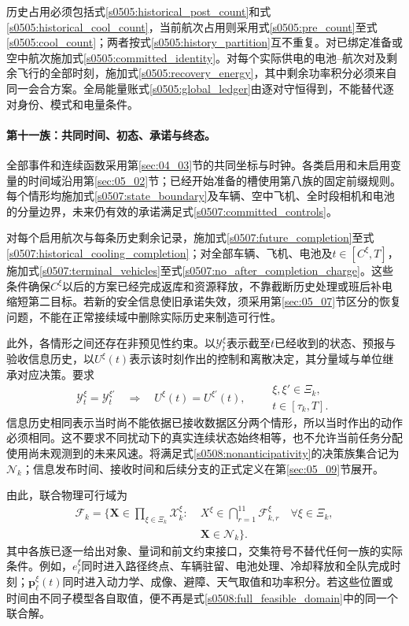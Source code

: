 历史占用必须包括式\eqref{s0505:historical_post_count}和式\eqref{s0505:historical_cool_count}，当前航次占用则采用式\eqref{s0505:pre_count}至式\eqref{s0505:cool_count}；两者按式\eqref{s0505:history_partition}互不重复。对已绑定准备或空中航次施加式\eqref{s0505:committed_identity}。对每个实际供电的电池--航次对及剩余飞行的全部时刻，施加式\eqref{s0505:recovery_energy}，其中剩余功率积分必须来自同一会合方案。全局能量账式\eqref{s0505:global_ledger}由逐对守恒得到，不能替代逐对身份、模式和电量条件。

\paragraph{第十一族：共同时间、初态、承诺与终态。}
全部事件和连续函数采用第\ref{sec:04_03}节的共同坐标与时钟。各类启用和未启用变量的时间域沿用第\ref{sec:05_02}节；已经开始准备的槽使用第八族的固定前缀规则。每个情形均施加式\eqref{s0507:state_boundary}及车辆、空中飞机、全时段相机和电池的分量边界，未来仍有效的承诺满足式\eqref{s0507:committed_controls}。

对每个启用航次与每条历史剩余记录，施加式\eqref{s0507:future_completion}至式\eqref{s0507:historical_cooling_completion}；对全部车辆、飞机、电池及$t\in[C^\xi,T]$，施加式\eqref{s0507:terminal_vehicles}至式\eqref{s0507:no_after_completion_charge}。这些条件确保$C^\xi$以后的方案已经完成返库和资源释放，不靠截断历史处理或班后补电缩短第二目标。若新的安全信息使旧承诺失效，须采用第\ref{sec:05_07}节区分的恢复问题，不能在正常接续域中删除实际历史来制造可行性。

此外，各情形之间还存在非预见性约束。以$\mathcal Y_t^\xi$表示截至$t$已经收到的状态、预报与验收信息历史，以$U^\xi(t)$表示该时刻作出的控制和离散决定，其分量域与单位继承对应决策。要求
\begin{equation}
 \mathcal Y_t^\xi=\mathcal Y_t^{\xi'}
 \quad\Longrightarrow\quad
 U^\xi(t)=U^{\xi'}(t),
 \qquad
 \substack{\xi,\xi'\in\Xi_k,\\t\in[\tau_k,T].}
 \label{s0508:nonanticipativity}
\end{equation}
信息历史相同表示当时尚不能依据已接收数据区分两个情形，所以当时作出的动作必须相同。这不要求不同扰动下的真实连续状态始终相等，也不允许当前任务分配使用尚未观测到的未来风速。将满足式\eqref{s0508:nonanticipativity}的决策族集合记为$\mathcal N_k$；信息发布时间、接收时间和后续分支的正式定义在第\ref{sec:05_09}节展开。

由此，联合物理可行域为
\begin{equation}
 \begin{aligned}
 \mathcal F_k=\bigl\{\mathbf X\in
   \prod_{\xi\in\Xi_k}\mathscr X_k^\xi:\;&
   X^\xi\in\bigcap_{r=1}^{11}\mathcal F_{k,r}^\xi
                  \quad\forall\xi\in\Xi_k,\\
 &\mathbf X\in\mathcal N_k\bigr\}.
 \end{aligned}
 \label{s0508:full_feasible_domain}
\end{equation}
其中各族已逐一给出对象、量词和前文约束接口，交集符号不替代任何一族的实际条件。例如，$e_\ell^\xi$同时进入路径终点、车辆驻留、电池处理、冷却释放和全队完成时刻；$\mathbf p_\ell^\xi(t)$同时进入动力学、成像、避障、天气取值和功率积分。若这些位置或时间由不同子模型各自取值，便不再是式\eqref{s0508:full_feasible_domain}中的同一个联合解。

